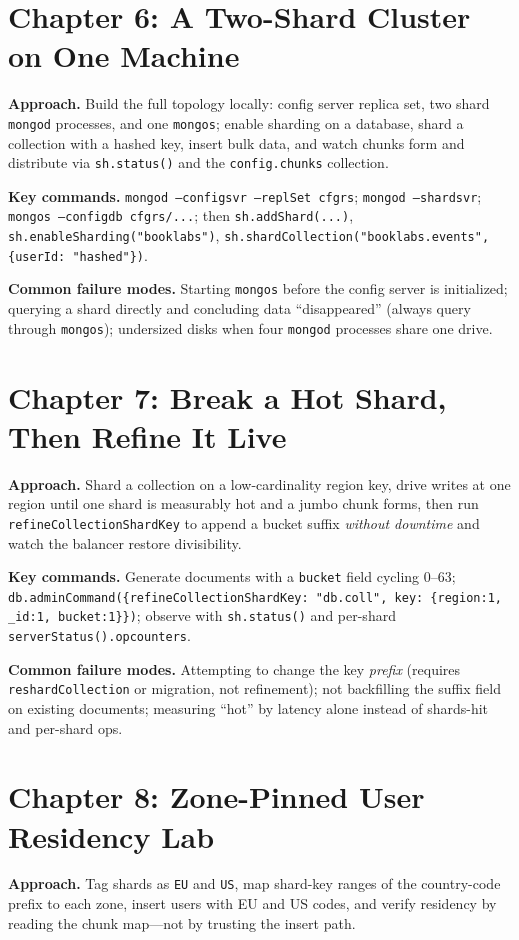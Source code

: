 \section{Chapter 6: A Two-Shard Cluster on One Machine}
\textbf{Approach.} Build the full topology locally: config server replica set, two shard
\texttt{mongod} processes, and one \texttt{mongos}; enable sharding on a database, shard a
collection with a hashed key, insert bulk data, and watch chunks form and distribute via
\texttt{sh.status()} and the \texttt{config.chunks} collection.

\textbf{Key commands.} \texttt{mongod --configsvr --replSet cfgrs}; \texttt{mongod --shardsvr};
\texttt{mongos --configdb cfgrs/...}; then \texttt{sh.addShard(...)},
\texttt{sh.enableSharding("booklabs")}, \texttt{sh.shardCollection("booklabs.events", \{userId: "hashed"\})}.

\textbf{Common failure modes.} Starting \texttt{mongos} before the config server is initialized;
querying a shard directly and concluding data ``disappeared'' (always query through
\texttt{mongos}); undersized disks when four \texttt{mongod} processes share one drive.

\section{Chapter 7: Break a Hot Shard, Then Refine It Live}
\textbf{Approach.} Shard a collection on a low-cardinality region key, drive writes at one
region until one shard is measurably hot and a jumbo chunk forms, then run
\texttt{refineCollectionShardKey} to append a bucket suffix \emph{without downtime} and watch the
balancer restore divisibility.

\textbf{Key commands.} Generate documents with a \texttt{bucket} field cycling 0--63;
\texttt{db.adminCommand(\{refineCollectionShardKey: "db.coll", key: \{region:1, \_id:1, bucket:1\}\})};
observe with \texttt{sh.status()} and per-shard \texttt{serverStatus().opcounters}.

\textbf{Common failure modes.} Attempting to change the key \emph{prefix} (requires
\texttt{reshardCollection} or migration, not refinement); not backfilling the suffix field on
existing documents; measuring ``hot'' by latency alone instead of shards-hit and per-shard ops.

\section{Chapter 8: Zone-Pinned User Residency Lab}
\textbf{Approach.} Tag shards as \texttt{EU} and \texttt{US}, map shard-key ranges of the
country-code prefix to each zone, insert users with EU and US codes, and verify residency by
reading the chunk map---not by trusting the insert path.

